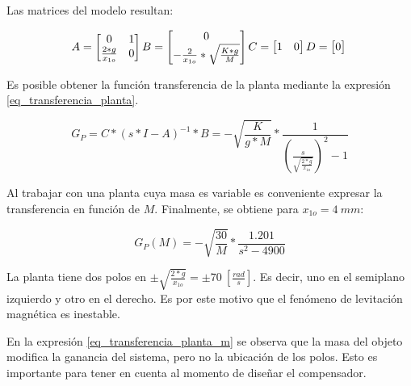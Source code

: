 \noindent Las matrices del modelo resultan:

\begin{equation*}
	A=
	\begin{bmatrix}
		0 & 1\\
		\frac{2*g}{x_{1o}} & 0
	\end{bmatrix}\\
	  B=
	\begin{bmatrix}
	0\\
	-\frac{2}{x_{1o}}*\sqrt{\frac{K*g}{M}}
	\end{bmatrix}\\
	  C=
	\begin{bmatrix}
	1 & 0\\
	\end{bmatrix}\\
	  D=
	\begin{bmatrix}
	0\\
	\end{bmatrix}\\
\end{equation*}



\noindent Es posible obtener la función transferencia de la planta mediante la expresión \ref{eq_transferencia_planta}.

\begin{equation}\label{eq_transferencia_planta}
	G_{P}=C*(s*I-A)^{-1}*B=-\sqrt{\frac{K}{g*M}}*\frac{1}{{(\frac{s}{\sqrt{\frac{2*g}{x_{1o}}}})^2-1}}
\end{equation}

\noindent \noindent Al trabajar con una planta cuya masa es variable es conveniente expresar la transferencia en función de $M$. Finalmente, se obtiene para $x_{1o}=4\:mm$:

\begin{equation} \label{eq_transferencia_planta_m}
	G_{P}(M)=-\sqrt{\frac{30}{M}}*\frac{1.201}{s^{2}-4900}
\end{equation}

\noindent La planta tiene dos polos en $\pm\sqrt{\frac{2*g}{x_{1o}}}=\pm70\:[\frac{rad}{s}]$. Es decir, uno en el semiplano izquierdo y otro en el derecho. Es por este motivo que el fenómeno de levitación magnética es inestable.

\noindent En la expresión \ref{eq_transferencia_planta_m} se observa que la masa del objeto modifica la ganancia del sistema, pero no la ubicación de los polos. Esto es importante para tener en cuenta al momento de diseñar el compensador.

